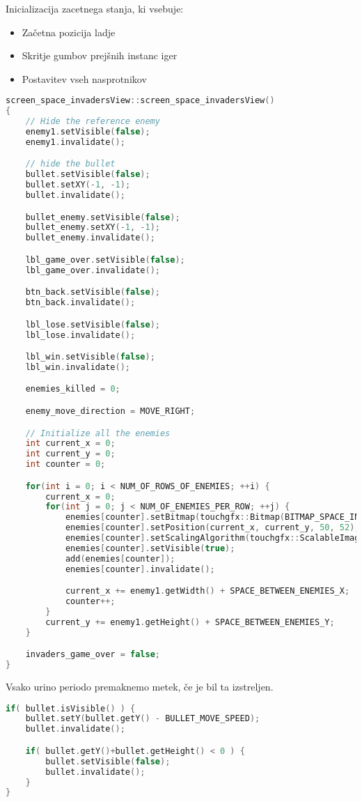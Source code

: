 \documentclass{article}
\begin{document}
\noindent
Inicializacija zacetnega stanja, ki vsebuje:
\begin{itemize}
  \item Za\v{c}etna pozicija ladje
  \item Skritje gumbov prej\v{s}nih instanc iger
  \item Postavitev vseh nasprotnikov
\end{itemize}
\begin{lstlisting}[language=c++]
screen_space_invadersView::screen_space_invadersView()
{
	// Hide the reference enemy
	enemy1.setVisible(false);
	enemy1.invalidate();

	// hide the bullet
	bullet.setVisible(false);
	bullet.setXY(-1, -1);
	bullet.invalidate();

	bullet_enemy.setVisible(false);
	bullet_enemy.setXY(-1, -1);
	bullet_enemy.invalidate();

	lbl_game_over.setVisible(false);
	lbl_game_over.invalidate();

	btn_back.setVisible(false);
	btn_back.invalidate();

	lbl_lose.setVisible(false);
	lbl_lose.invalidate();

	lbl_win.setVisible(false);
	lbl_win.invalidate();

	enemies_killed = 0;

	enemy_move_direction = MOVE_RIGHT;

	// Initialize all the enemies
	int current_x = 0;
	int current_y = 0;
	int counter = 0;

	for(int i = 0; i < NUM_OF_ROWS_OF_ENEMIES; ++i) {
		current_x = 0;
		for(int j = 0; j < NUM_OF_ENEMIES_PER_ROW; ++j) {
			enemies[counter].setBitmap(touchgfx::Bitmap(BITMAP_SPACE_INVADERS_ENEMY_ID));
			enemies[counter].setPosition(current_x, current_y, 50, 52);
			enemies[counter].setScalingAlgorithm(touchgfx::ScalableImage::NEAREST_NEIGHBOR);
			enemies[counter].setVisible(true);
			add(enemies[counter]);
			enemies[counter].invalidate();

			current_x += enemy1.getWidth() + SPACE_BETWEEN_ENEMIES_X;
			counter++;
		}
		current_y += enemy1.getHeight() + SPACE_BETWEEN_ENEMIES_Y;
	}

	invaders_game_over = false;
}
\end{lstlisting}

\noindent
Vsako urino periodo premaknemo metek, \v{c}e je bil ta izstreljen.
\begin{lstlisting}[language=c++]
if( bullet.isVisible() ) {
    bullet.setY(bullet.getY() - BULLET_MOVE_SPEED);
    bullet.invalidate();

    if( bullet.getY()+bullet.getHeight() < 0 ) {
        bullet.setVisible(false);
        bullet.invalidate();
    }
}
\end{lstlisting}
\end{document}
